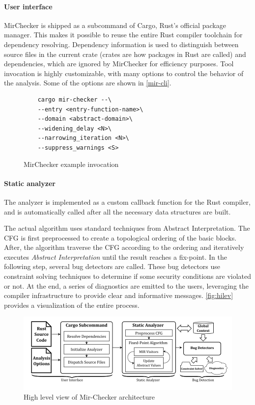 \documentclass{article}
\begin{document}
\paragraph{User interface} MirChecker is shipped as a subcommand of  
Cargo, Rust's official package manager. This makes it possible to reuse the entire
Rust compiler toolchain for dependency resolving. Dependency information is used 
to distinguish between source files in the current crate (crates are how packages in Rust are called) and dependencies, which are ignored 
by MirChecker for efficiency purposes. Tool invocation is highly customizable, with many options 
to control the behavior of the analysis. Some of the options are shown in \autoref{mir-cli}.
\begin{figure}[H]
\begin{verbatim}
    cargo mir-checker --\ 
    --entry <entry-function-name>\
    --domain <abstract-domain>\ 
    --widening_delay <N>\
    --narrowing_iteration <N>\ 
    --suppress_warnings <S>
\end{verbatim}
    \caption{MirChecker example invocation}
    \label{mir-cli}

\end{figure}


\paragraph{Static analyzer}
The analyzer is implemented as a custom callback function for the Rust compiler, and is 
automatically called after all the necessary data structures are built. 

The actual algorithm uses standard techniques from Abstract Interpretation.
The CFG is first preprocessed to create a topological ordering of the basic blocks. After, the algorithm traverse the CFG according to the ordering 
and iteratively executes \textit{Abstract Interpretation} until the result reaches a fix-point.
In the following step, several bug detectors are called. These bug detectors use 
constraint solving techniques to determine if some security conditions are violated or not. At the end, a series of 
diagnostics are emitted to the users, leveraging the compiler infrastructure to provide clear and informative messages.
\autoref{fig:hilev} provides a visualization of the entire process.
\begin{figure}[H]
    \includegraphics[scale=0.5]{hilev.png}
    \caption{High level view of Mir-Checker architecture}
    \label{fig:hilev}
\end{figure}
\end{document}
